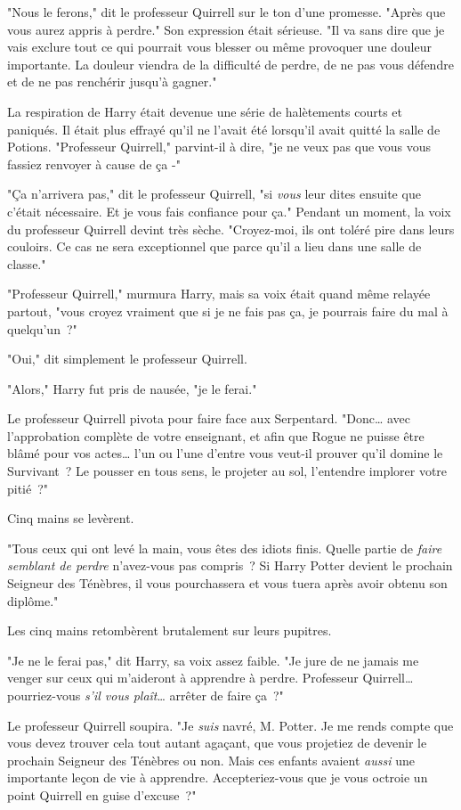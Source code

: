 "Nous le ferons," dit le professeur Quirrell sur le ton d'une promesse. "Après que vous aurez appris à perdre." Son expression était sérieuse. "Il va sans dire que je vais exclure tout ce qui pourrait vous blesser ou même provoquer une douleur importante. La douleur viendra de la difficulté de perdre, de ne pas vous défendre et de ne pas renchérir jusqu'à gagner."

La respiration de Harry était devenue une série de halètements courts et paniqués. Il était plus effrayé qu'il ne l'avait été lorsqu'il avait quitté la salle de Potions. "Professeur Quirrell," parvint-il à dire, "je ne veux pas que vous vous fassiez renvoyer à cause de ça -"

"Ça n'arrivera pas," dit le professeur Quirrell, "si \emph{vous} leur dites ensuite que c'était nécessaire. Et je vous fais confiance pour ça." Pendant un moment, la voix du professeur Quirrell devint très sèche. "Croyez-moi, ils ont toléré pire dans leurs couloirs. Ce cas ne sera exceptionnel que parce qu'il a lieu dans une salle de classe."

"Professeur Quirrell," murmura Harry, mais sa voix était quand même relayée partout, "vous croyez vraiment que si je ne fais pas ça, je pourrais faire du mal à quelqu'un~?"

"Oui," dit simplement le professeur Quirrell.

"Alors," Harry fut pris de nausée, "je le ferai."

Le professeur Quirrell pivota pour faire face aux Serpentard. "Donc… avec l'approbation complète de votre enseignant, et afin que Rogue ne puisse être blâmé pour vos actes… l'un ou l'une d'entre vous veut-il prouver qu'il domine le Survivant~? Le pousser en tous sens, le projeter au sol, l'entendre implorer votre pitié~?"

Cinq mains se levèrent.

"Tous ceux qui ont levé la main, vous êtes des idiots finis. Quelle partie de \emph{faire semblant de perdre} n'avez-vous pas compris~? Si Harry Potter devient le prochain Seigneur des Ténèbres, il vous pourchassera et vous tuera après avoir obtenu son diplôme."

Les cinq mains retombèrent brutalement sur leurs pupitres.

"Je ne le ferai pas," dit Harry, sa voix assez faible. "Je jure de ne jamais me venger sur ceux qui m'aideront à apprendre à perdre. Professeur Quirrell… pourriez-vous \emph{s'il vous plaît}… arrêter de faire ça~?"

Le professeur Quirrell soupira. "Je \emph{suis} navré, M. Potter. Je me rends compte que vous devez trouver cela tout autant agaçant, que vous projetiez de devenir le prochain Seigneur des Ténèbres ou non. Mais ces enfants avaient \emph{aussi} une importante leçon de vie à apprendre. Accepteriez-vous que je vous octroie un point Quirrell en guise d'excuse~?"

